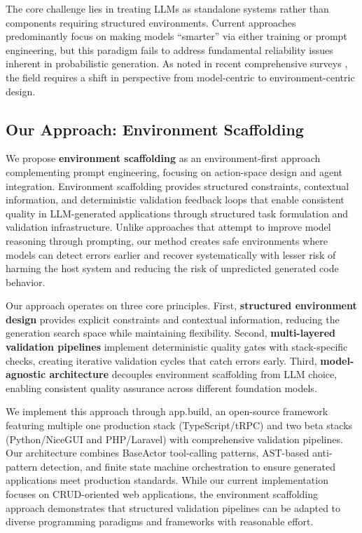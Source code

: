 \documentclass{article}
\begin{document}
The core challenge lies in treating LLMs as standalone systems rather than components requiring structured environments. Current approaches predominantly focus on making models ``smarter'' via either training or prompt engineering, but this paradigm fails to address fundamental reliability issues inherent in probabilistic generation. As noted in recent comprehensive surveys \citep{jiang2024survey,paul2024benchmarks}, the field requires a shift in perspective from model-centric to environment-centric design.

\subsection{Our Approach: Environment Scaffolding}

We propose \textbf{environment scaffolding} as an environment-first approach complementing prompt engineering, focusing on action-space design and agent integration. Environment scaffolding provides structured constraints, contextual information, and deterministic validation feedback loops that enable consistent quality in LLM-generated applications through structured task formulation and validation infrastructure. Unlike approaches that attempt to improve model reasoning through prompting, our method creates safe environments where models can detect errors earlier and recover systematically with lesser risk of harming the host system and reducing the risk of unpredicted generated code behavior.

Our approach operates on three core principles. First, \textbf{structured environment design} provides explicit constraints and contextual information, reducing the generation search space while maintaining flexibility. Second, \textbf{multi-layered validation pipelines} implement deterministic quality gates with stack-specific checks, creating iterative validation cycles that catch errors early. Third, \textbf{model-agnostic architecture} decouples environment scaffolding from LLM choice, enabling consistent quality assurance across different foundation models.

We implement this approach through app.build, an open-source framework featuring multiple one production stack (TypeScript/tRPC) and two beta stacks (Python/NiceGUI and PHP/Laravel) with comprehensive validation pipelines. Our architecture combines BaseActor tool-calling patterns, AST-based anti-pattern detection, and finite state machine orchestration to ensure generated applications meet production standards. While our current implementation focuses on CRUD-oriented web applications, the environment scaffolding approach demonstrates that structured validation pipelines can be adapted to diverse programming paradigms and frameworks with reasonable effort.
\end{document}

